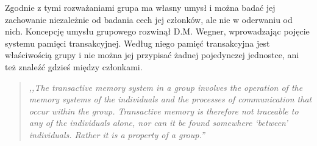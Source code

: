 Zgodnie z tymi rozważaniami grupa ma własny umysł i można badać jej zachowanie
niezależnie od badania cech jej członków, ale nie w oderwaniu od nich. Koncepcję
umysłu grupowego rozwinął D.M. Wegner, wprowadzając pojęcie systemu pamięci
transakcyjnej. Według niego pamięć transakcyjna jest właściwością grupy i nie
można jej przypisać żadnej pojedynczej jednostce, ani też znaleźć gdzieś między
członkami.

\begin{quote}\em
,,The transactive memory system in a group involves the operation of the 
memory systems of the individuals and the processes of communication that occur 
within the group. Transactive memory is therefore not traceable to any of the 
individuals alone, nor can it be found somewhere `between' individuals. Rather 
it is a property of a group.'' \cite{Wegner1986}
\end{quote}

